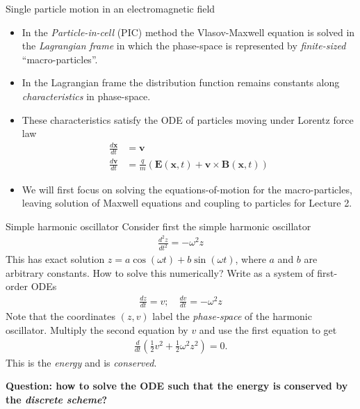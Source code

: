 \documentclass[pdf]{beamer}
\newcommand{\mvec}[1]{\mathbf{#1}}
\theoremstyle{definition}
\begin{document}
\begin{frame}{Single particle motion in an electromagnetic field}
  \small%
  \begin{itemize}
  \item In the \emph{Particle-in-cell} (PIC) method the Vlasov-Maxwell
    equation is solved in the \emph{Lagrangian frame} in which the
    phase-space is represented by \emph{finite-sized}
    ``macro-particles''.
  \item In the Lagrangian frame the distribution
    function remains constants along \emph{characteristics} in
    phase-space.
  \item These characteristics satisfy the ODE of particles moving
    under Lorentz force law
    \begin{align*}
      \frac{d\mvec{x}}{dt} &= \mvec{v} \\
      \frac{d\mvec{v}}{dt} &= \frac{q}{m}(\mvec{E}(\mvec{x},t) + \mvec{v}\times\mvec{B}(\mvec{x},t))
    \end{align*}
  \item We will first focus on solving the equations-of-motion for
    the macro-particles, leaving solution of Maxwell equations and
    coupling to particles for Lecture 2.
  \end{itemize}
\end{frame}

\begin{frame}{Simple harmonic oscillator}
  \small%
  Consider first the simple harmonic oscillator
  \begin{align*}
    \frac{d^2z}{dt^2} = -\omega^2 z
  \end{align*}
  This has exact solution $z = a\cos(\omega t) + b\sin(\omega t)$,
  where $a$ and $b$ are arbitrary constants. How to solve this
  numerically? Write as a system of first-order ODEs
  \begin{align*}
    \frac{dz}{dt} = v; \quad \frac{dv}{dt} = -\omega^2 z
  \end{align*}
  Note that the coordinates $(z,v)$ label the \emph{phase-space} of
  the harmonic oscillator. Multiply the second equation by $v$ and use
  the first equation to get
  \begin{align*}
    \frac{d}{dt}\left(\frac{1}{2} v^2 + \frac{1}{2}\omega^2 z^2\right) = 0.
  \end{align*}
  This is the \emph{energy} and is \emph{conserved}.%
  
  \bf{Question: how to solve the ODE such that the energy is conserved
    by the \emph{discrete scheme}?}
\end{frame}
\end{document}
